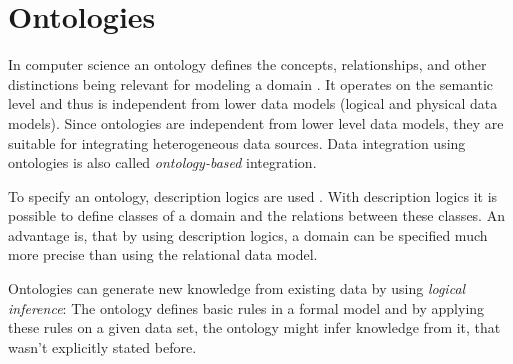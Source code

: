 \section{Ontologies}

In computer science an ontology defines the concepts, relationships, and other distinctions being relevant for modeling a domain \cite{9780387355443}. It operates on the semantic level and thus is independent from lower data models (logical and physical data models). Since ontologies are independent from lower level data models, they are suitable for integrating heterogeneous data sources. Data integration using ontologies is also called \emph{ontology-based} integration.

To specify an ontology, description logics are used \cite[p. 267]{DBLP:books/dp/LeserN2006}. With description logics it is possible to define classes of a domain and the relations between these classes. An advantage is, that by using description logics, a domain can be specified much more precise than using the relational data model. 

Ontologies can generate new knowledge from existing data by using \emph{logical inference}: The ontology defines basic rules in a formal model and by applying these rules on a given data set, the ontology might infer knowledge from it, that wasn't explicitly stated before.